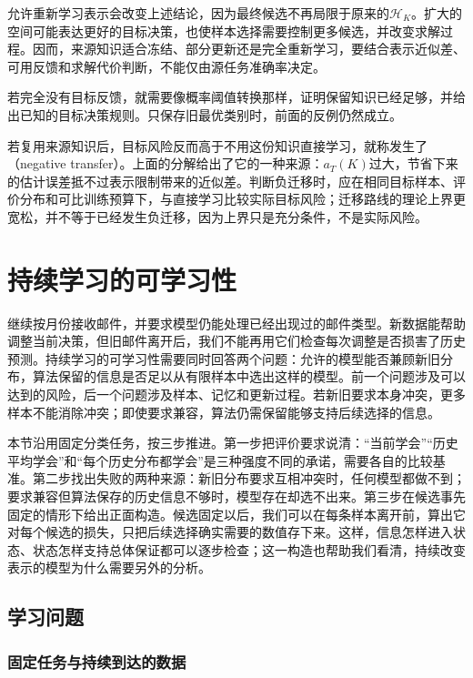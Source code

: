 允许重新学习表示会改变上述结论，因为最终候选不再局限于原来的$\mathcal H_K$。扩大的空间可能表达更好的目标决策，也使样本选择需要控制更多候选，并改变求解过程。因而，来源知识适合冻结、部分更新还是完全重新学习，要结合表示近似差、可用反馈和求解代价判断，不能仅由源任务准确率决定。

若完全没有目标反馈，就需要像概率阈值转换那样，证明保留知识已经足够，并给出已知的目标决策规则。只保存旧最优类别时，前面的反例仍然成立。

若复用来源知识后，目标风险反而高于不用这份知识直接学习，就称发生了（negative transfer）。上面的分解给出了它的一种来源：$a_T(K)$过大，节省下来的估计误差抵不过表示限制带来的近似差。判断负迁移时，应在相同目标样本、评价分布和可比训练预算下，与直接学习比较实际目标风险；迁移路线的理论上界更宽松，并不等于已经发生负迁移，因为上界只是充分条件，不是实际风险。
\section{持续学习的可学习性}
\label{sec:continual-learnability}

继续按月份接收邮件，并要求模型仍能处理已经出现过的邮件类型。新数据能帮助调整当前决策，但旧邮件离开后，我们不能再用它们检查每次调整是否损害了历史预测。持续学习的可学习性需要同时回答两个问题：允许的模型能否兼顾新旧分布，算法保留的信息是否足以从有限样本中选出这样的模型。前一个问题涉及可以达到的风险，后一个问题涉及样本、记忆和更新过程。若新旧要求本身冲突，更多样本不能消除冲突；即使要求兼容，算法仍需保留能够支持后续选择的信息。

本节沿用固定分类任务，按三步推进。第一步把评价要求说清：“当前学会”“历史平均学会”和“每个历史分布都学会”是三种强度不同的承诺，需要各自的比较基准。第二步找出失败的两种来源：新旧分布要求互相冲突时，任何模型都做不到；要求兼容但算法保存的历史信息不够时，模型存在却选不出来。第三步在候选事先固定的情形下给出正面构造。候选固定以后，我们可以在每条样本离开前，算出它对每个候选的损失，只把后续选择确实需要的数值存下来。这样，信息怎样进入状态、状态怎样支持总体保证都可以逐步检查；这一构造也帮助我们看清，持续改变表示的模型为什么需要另外的分析。

\subsection{学习问题}

\subsubsection{固定任务与持续到达的数据}

